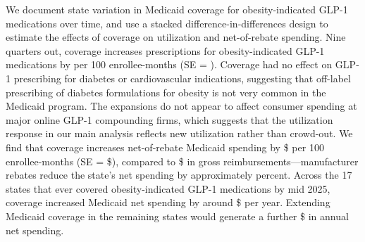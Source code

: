 We document state variation in Medicaid coverage for obesity-indicated GLP-1 medications over time, and use a stacked difference-in-differences design to estimate the effects of coverage on utilization and net-of-rebate spending. Nine quarters out, coverage increases prescriptions for obesity-indicated GLP-1 medications by \rxObSevenNineEmw{} per 100 enrollee-months (SE = \rxObSevenNineEmwSE{}). Coverage had no effect on GLP-1 prescribing for diabetes or cardiovascular indications, suggesting that off-label prescribing of diabetes formulations for obesity is not very common in the Medicaid program. The expansions do not appear to affect consumer spending at major online GLP-1 compounding firms, which suggests that the utilization response in our main analysis reflects new utilization rather than crowd-out. We find that coverage increases net-of-rebate Medicaid spending by \$\netSpObSevenNineEmw{} per 100 enrollee-months (SE = \$\netSpObSevenNineEmwSE{}), compared to \$\spObSevenNineEmw{} in gross reimbursements---manufacturer rebates reduce the state's net spending by approximately \spReductionObSevenNineEmw{} percent. Across the 17 states that ever covered obesity-indicated GLP-1 medications by mid 2025, coverage increased Medicaid net spending by around \$\netCostCoveringEtNine{} per year. Extending Medicaid coverage in the remaining states would generate a further \$\netCostNoncoveringEtNine{} in annual net spending.